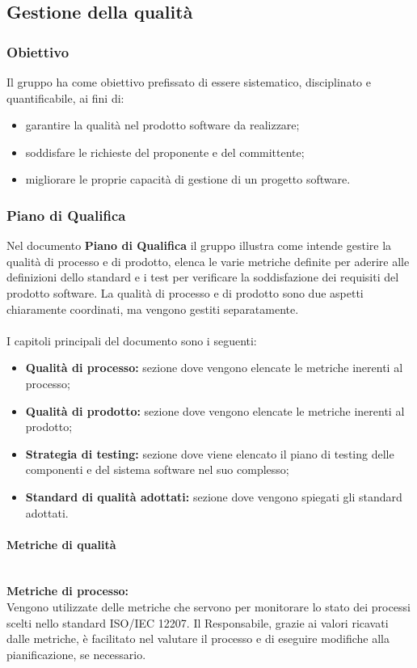 \subsection{Gestione della qualità}
\subsubsection{Obiettivo}
Il gruppo \Gruppo ha come obiettivo prefissato di essere sistematico, disciplinato e quantificabile, ai fini di:
\begin{itemize}
    \item garantire la qualità nel prodotto software da realizzare;
    \item soddisfare le richieste del proponente e del committente;
    \item migliorare le proprie capacità di gestione di un progetto software.
\end{itemize}

\subsubsection{Piano di Qualifica}
Nel documento \textbf{Piano di Qualifica} il gruppo \Gruppo illustra come intende gestire la qualità di processo e di prodotto, elenca le varie metriche definite per aderire alle definizioni dello standard e i test per verificare la soddisfazione dei requisiti del prodotto software.
La qualità di processo e di prodotto sono due aspetti chiaramente coordinati, ma vengono gestiti separatamente. \\ \\
I capitoli principali del documento sono i seguenti:
\begin{itemize}
    \item \textbf{Qualità di processo:} sezione dove vengono elencate le metriche inerenti al processo;
    \item \textbf{Qualità di prodotto:} sezione dove vengono elencate le metriche inerenti al prodotto;
    \item \textbf{Strategia di testing:} sezione dove viene elencato il piano di testing delle componenti e del sistema software nel suo complesso;
    \item \textbf{Standard di qualità adottati:} sezione dove vengono spiegati gli standard adottati.
\end{itemize}

\paragraph{Metriche di qualità}\mbox{}\\
\textbf{Metriche di processo:}\\
Vengono utilizzate delle metriche che servono per monitorare lo stato dei processi scelti nello standard ISO/IEC 12207. Il Responsabile, grazie ai valori ricavati dalle metriche, è facilitato nel
valutare il processo e di eseguire modifiche alla pianificazione, se necessario.\\

